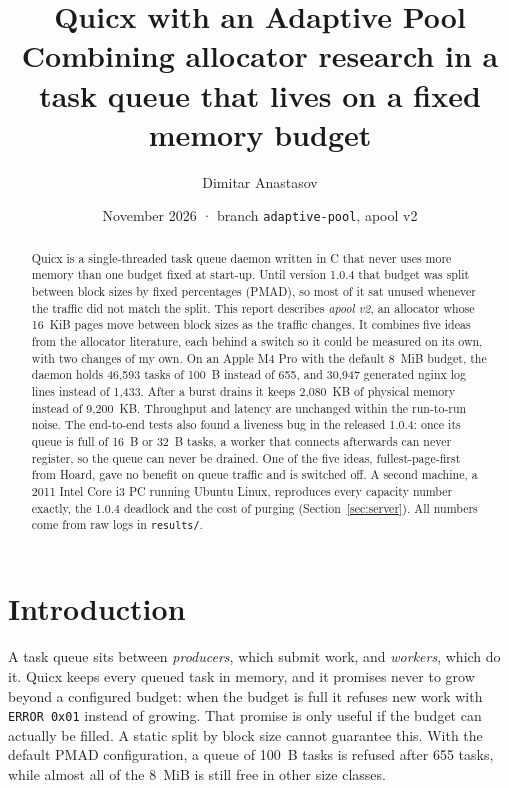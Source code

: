 \documentclass[10.5pt,a4paper]{article}
\title{\textbf{Quicx with an Adaptive Pool}\\[3pt]
\large Combining allocator research in a task queue that lives on a fixed memory budget}
\author{Dimitar Anastasov}
\date{November 2026 · branch \texttt{adaptive-pool}, apool v2}
\newcommand{\file}[1]{\texttt{\small #1}}
\begin{document}
\maketitle

\begin{abstract}
\noindent
Quicx is a single-threaded task queue daemon written in C that never uses more memory than one budget fixed at start-up. Until version 1.0.4 that budget was split between block sizes by fixed percentages (PMAD), so most of it sat unused whenever the traffic did not match the split. This report describes \emph{apool v2}, an allocator whose 16~KiB pages move between block sizes as the traffic changes. It combines five ideas from the allocator literature, each behind a switch so it could be measured on its own, with two changes of my own. On an Apple M4 Pro with the default 8~MiB budget, the daemon holds 46,593 tasks of 100~B instead of 655, and 30,947 generated nginx log lines instead of 1,433. After a burst drains it keeps 2,080~KB of physical memory instead of 9,200~KB. Throughput and latency are unchanged within the run-to-run noise. The end-to-end tests also found a liveness bug in the released 1.0.4: once its queue is full of 16~B or 32~B tasks, a worker that connects afterwards can never register, so the queue can never be drained. One of the five ideas, fullest-page-first from Hoard, gave no benefit on queue traffic and is switched off. A second machine, a 2011 Intel Core i3 PC running Ubuntu Linux, reproduces every capacity number exactly, the 1.0.4 deadlock and the cost of purging (Section~\ref{sec:server}). All numbers come from raw logs in \file{results/}.
\end{abstract}

\section{Introduction}

A task queue sits between \emph{producers}, which submit work, and \emph{workers}, which do it. Quicx keeps every queued task in memory, and it promises never to grow beyond a configured budget: when the budget is full it refuses new work with \texttt{ERROR 0x01} instead of growing. That promise is only useful if the budget can actually be filled. A static split by block size cannot guarantee this. With the default PMAD configuration, a queue of 100~B tasks is refused after 655 tasks, while almost all of the 8~MiB is still free in other size classes.
\end{document}
